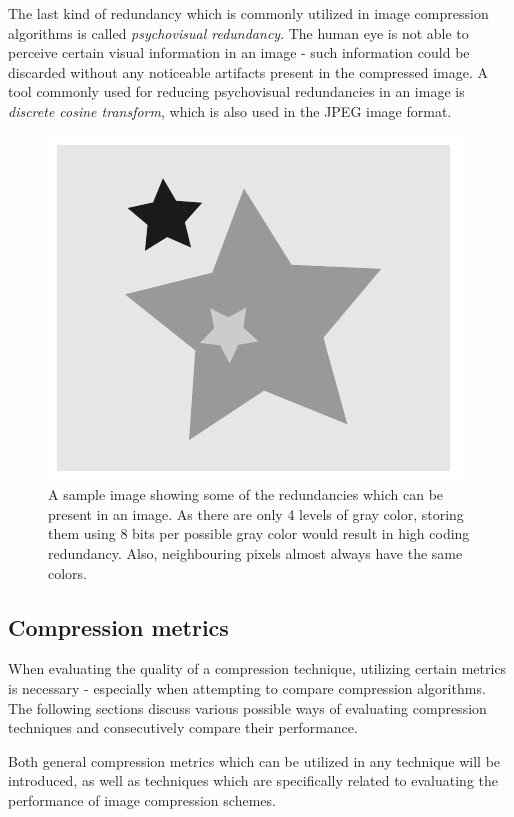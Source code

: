 \documentclass[thesis=M,english]{FITthesis}[2012/10/20]
\begin{document}
The last kind of redundancy which is commonly utilized in image compression
algorithms is called \emph{psychovisual redundancy}. The human eye is not
able to perceive certain visual information in an image - such information could
be discarded without any noticeable artifacts present in the compressed image.
A tool commonly used for reducing psychovisual redundancies in an image is
\emph{discrete cosine transform}, which is also used in the JPEG image
format.

\begin{figure}[h]
  \centering
  \includegraphics{imgs/redundancies}
  \caption[An image showing some of the redundancies which exist in images]{A sample image showing some of the redundancies which can be present in an image.
  		  As there are only 4 levels of gray color, storing them using 8 bits
  		  per possible gray color would result in high coding redundancy. Also,
  		  neighbouring pixels almost always have the same colors.}
  \label{fig:redundancies}
\end{figure}

\subsection{Compression metrics}
\label{metrics}
When evaluating the quality of a compression technique, utilizing certain
metrics is necessary - especially when attempting to compare compression
algorithms. The following sections discuss various possible ways of
evaluating compression techniques and consecutively compare their performance.

Both general compression metrics which can be utilized in any technique will
be introduced, as well as techniques which are specifically related to
evaluating the performance of image compression schemes.
\end{document}
